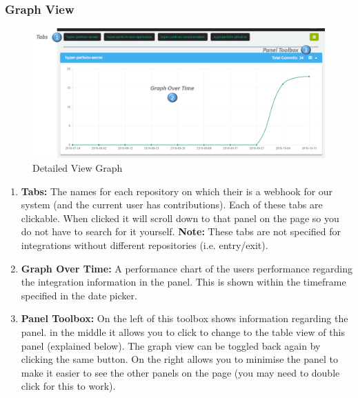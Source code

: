\documentclass[11pt,a4paper]{article}
\begin{document}
\subsubsection{Graph View}
\begin{figure}[H]
	\begin{center}
		\includegraphics[scale=0.27]{../Images/Getting_Started/GitHub_Detailed_Graph_numbered}
		\caption{Detailed View Graph}
	\end{center}
\end{figure}
\begin{enumerate}
	\item \textbf{Tabs:} The names for each repository on which their is a webhook for our system (and the current user has contributions). Each of these tabs are clickable. When clicked it will scroll down to that panel on the page so you do not have to search for it yourself. \textbf{Note:} These tabs are not specified for integrations without different repositories (i.e. entry/exit).
	\item \textbf{Graph Over Time:} A performance chart of the users performance regarding the integration information in the panel. This is shown within the timeframe specified in the date picker. 
	\item \textbf{Panel Toolbox:} On the left of this toolbox shows information regarding the panel. in the middle it allows you to click to change to the table view of this panel (explained below). The graph view can be toggled back again by clicking the same button. On the right allows you to minimise the panel to make it easier to see the other panels on the page (you may need to double click for this to work).
\end{enumerate}
\end{document}

